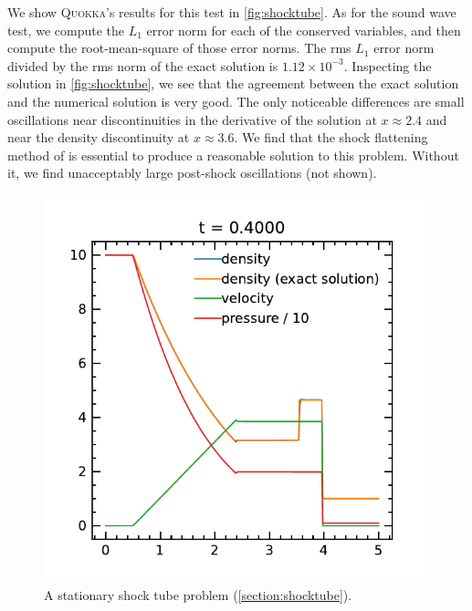 \documentclass[fleqn,usenatbib]{mnras}
\newcommand{\quokka}{\textsc{Quokka}}
\begin{document}
We show \quokka's results for this test in \autoref{fig:shocktube}. As for the sound wave test, we compute the $L_1$ error norm for each of the conserved variables, and then compute the root-mean-square of those error norms. The rms $L_1$ error norm divided by the rms norm of the exact solution is $1.12 \times 10^{-3}$. Inspecting the solution in \autoref{fig:shocktube}, we see that the agreement between the exact solution and the numerical solution is very good. The only noticeable differences are small oscillations near discontinuities in the derivative of the solution at $x \approx 2.4$ and near the density discontinuity at $x \approx 3.6$. We find that the shock flattening method of \cite{Miller_2002} is essential to produce a reasonable solution to this problem. Without it, we find unacceptably large post-shock oscillations (not shown).
\begin{figure}
    \includegraphics[width=\columnwidth]{hydro_shocktube_0.4000.pdf}
    \caption{A stationary shock tube problem (\autoref{section:shocktube}).}
    \label{fig:shocktube}
\end{figure}
\end{document}
